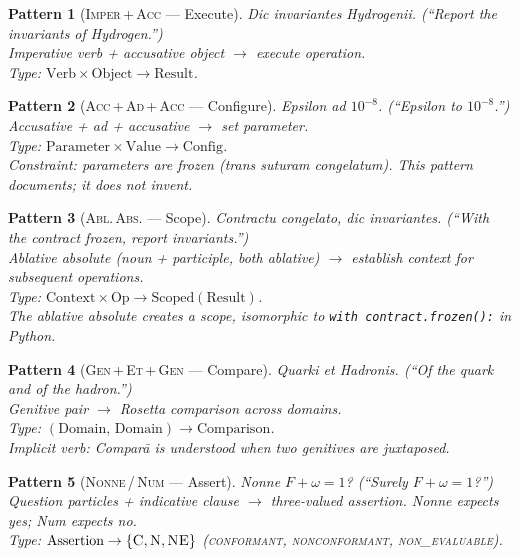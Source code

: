 \documentclass[
  aps,
  prd,
  twocolumn,
  superscriptaddress,
  nofootinbib,
  floatfix
]{revtex4-2}
\newtheorem{pattern}{Pattern}
\newcommand{\regime}[1]{\textrm{\upshape\scshape#1}}
\newcommand{\conform}{\regime{conformant}}
\newcommand{\nonconform}{\regime{nonconformant}}
\newcommand{\Fid}{F}
\newcommand{\Drft}{\omega}
\newcommand{\lat}[1]{\textit{#1}}
\begin{document}
\begin{pattern}[\textsc{Imper\,+\,Acc} --- Execute]\label{pat:imper-acc}
\lat{Dic invariantes Hydrogenii.}
(``Report the invariants of Hydrogen.'')\\
Imperative verb + accusative object $\to$ execute operation.\\
Type: $\mathrm{Verb} \times \mathrm{Object} \to \mathrm{Result}$.
\end{pattern}

\begin{pattern}[\textsc{Acc\,+\,Ad\,+\,Acc} ---
  Configure]\label{pat:acc-ad-acc}
\lat{Epsilon ad $10^{-8}$.} (``Epsilon to $10^{-8}$.'')\\
Accusative + \lat{ad} + accusative $\to$ set parameter.\\
Type: $\mathrm{Parameter} \times \mathrm{Value}
  \to \mathrm{Config}$.\\
Constraint: parameters are frozen (\lat{trans suturam congelatum}).
This pattern documents; it does not invent.
\end{pattern}

\begin{pattern}[\textsc{Abl.\,Abs.} --- Scope]\label{pat:abl-abs}
\lat{Contractu congelato, dic invariantes.}
(``With the contract frozen, report invariants.'')\\
Ablative absolute (noun + participle, both ablative) $\to$
establish context for subsequent operations.\\
Type: $\mathrm{Context} \times \mathrm{Op}
  \to \mathrm{Scoped}(\mathrm{Result})$.\\
The ablative absolute creates a \emph{scope}, isomorphic to
\texttt{with contract.frozen():} in Python.
\end{pattern}

\begin{pattern}[\textsc{Gen\,+\,Et\,+\,Gen} ---
  Compare]\label{pat:gen-et-gen}
\lat{Quarki et Hadronis.}
(``Of the quark and of the hadron.'')\\
Genitive pair $\to$ Rosetta comparison across domains.\\
Type: $(\mathrm{Domain},\,\mathrm{Domain})
  \to \mathrm{Comparison}$.\\
Implicit verb: \lat{Compar\=a} is understood when two genitives
are juxtaposed.
\end{pattern}

\begin{pattern}[\textsc{Nonne\,/\,Num} ---
  Assert]\label{pat:nonne-num}
\lat{Nonne $\Fid + \Drft = 1$?}
(``Surely $\Fid + \Drft = 1$?'')\\
Question particles + indicative clause $\to$ three-valued
assertion.
\lat{Nonne} expects yes; \lat{Num} expects no.\\
Type: $\mathrm{Assertion} \to \{\textsc{C},\textsc{N},\textsc{NE}\}$
(\conform, \nonconform, \regime{non\_evaluable}).
\end{pattern}
\end{document}
